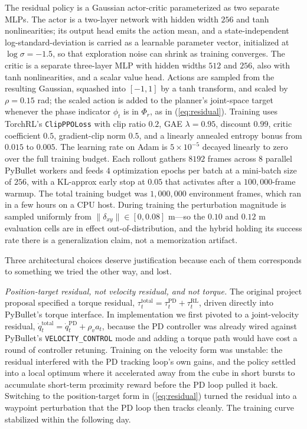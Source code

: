 \documentclass[letterpaper, 11 pt, journal, twoside]{IEEEtran}
\def\rep#1{(\ref{#1})}
\begin{document}
The residual policy is a Gaussian actor-critic parameterized as two separate MLPs. The actor is a two-layer network with hidden width $256$ and tanh nonlinearities; its output head emits the action mean, and a state-independent log-standard-deviation is carried as a learnable parameter vector, initialized at $\log \sigma = -1.5$, so that exploration noise can shrink as training converges. The critic is a separate three-layer MLP with hidden widths $512$ and $256$, also with tanh nonlinearities, and a scalar value head. Actions are sampled from the resulting Gaussian, squashed into $[-1, 1]$ by a tanh transform, and scaled by $\rho = 0.15$ rad; the scaled action is added to the planner's joint-space target whenever the phase indicator $\phi_t$ is in $\Phi_r$, as in \rep{eq:residual}. Training uses TorchRL's \cite{Bou2023TorchRL} {\tt ClipPPOLoss} with clip ratio $0.2$, GAE $\lambda = 0.95$, discount $0.99$, critic coefficient $0.5$, gradient-clip norm $0.5$, and a linearly annealed entropy bonus from $0.015$ to $0.005$. The learning rate on Adam is $5 \times 10^{-5}$ decayed linearly to zero over the full training budget. Each rollout gathers $8192$ frames across $8$ parallel PyBullet workers and feeds $4$ optimization epochs per batch at a mini-batch size of $256$, with a KL-approx early stop at $0.05$ that activates after a $100{,}000$-frame warmup. The total training budget was $1{,}000{,}000$ environment frames, which ran in a few hours on a CPU host. During training the perturbation magnitude is sampled uniformly from $\|\delta_{xy}\| \in [0, 0.08]$ m---so the $0.10$ and $0.12$ m evaluation cells are in effect out-of-distribution, and the hybrid holding its success rate there is a generalization claim, not a memorization artifact.

Three architectural choices deserve justification because each of them corresponds to something we tried the other way, and lost.

\emph{Position-target residual, not velocity residual, and not torque.} The original project proposal specified a torque residual, $\tau^{\mathrm{total}}_t = \tau^{\mathrm{PD}}_t + \tau^{\mathrm{RL}}_t$, driven directly into PyBullet's torque interface. In implementation we first pivoted to a joint-velocity residual, $\dot q^{\mathrm{total}}_t = \dot q^{\mathrm{PD}}_t + \rho_v a_t$, because the PD controller was already wired against PyBullet's {\tt VELOCITY\_CONTROL} mode and adding a torque path would have cost a round of controller retuning. Training on the velocity form was unstable: the residual interfered with the PD tracking loop's own gains, and the policy settled into a local optimum where it accelerated away from the cube in short bursts to accumulate short-term proximity reward before the PD loop pulled it back. Switching to the position-target form in \rep{eq:residual} turned the residual into a waypoint perturbation that the PD loop then tracks cleanly. The training curve stabilized within the following day.
\end{document}
